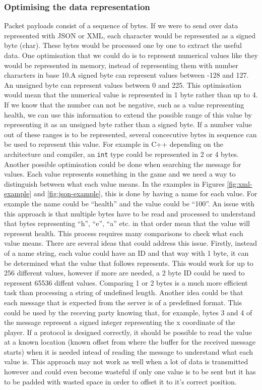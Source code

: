 \subsubsection{Optimising the data representation}
Packet payloads consist of a sequence of bytes. If we were to send over data represented with JSON or XML, each character would be represented as a signed byte (char). These bytes would be processed one by one to extract the useful data. One optimisation that we could do is to represent numerical values like they would be represented in memory, instead of representing them with number characters in base 10.A signed byte can represent values between -128 and 127. An unsigned byte can represent values between 0 and 225. This optimisation would mean that the numerical value is represented in 1 byte rather than up to 4. If we know that the number can not be negative, such as a value representing health, we can use this information to extend the possible range of this value by representing it as an unsigned byte rather than a signed byte. If a number value out of these ranges is to be represented, several concecutive bytes in sequence can be used to represent this value. For example in C++ depending on the architecture and compiler, an \lstinline{int} type could be represented in 2 or 4 bytes.
Another possible optimisation could be done when searching the message for values. Each value represents something in the game and we need a way to distinguish between what each value means. In the examples in Figures \ref{fig:xml-example} and \ref{fig:json-example}, this is done by having a name for each value. For example the name could be ``health'' and the value could be ``100''. An issue with this approach is that multiple bytes have to be read and processed to understand that bytes representing ``h'', ``e'', ``a'' etc. in that order mean that the value will represent health. This process requires many comparisons to check what each value means. There are several ideas that could address this issue. Firstly, instead of a name string, each value could have an ID and that way with 1 byte, it can be determined what the value that follows represents. This would work for up to 256 different values, however if more are needed, a 2 byte ID could be used to represent 65536 diffent values. Comparing 1 or 2 bytes is a much more efficient task than processing a string of undefined length. Another idea could be that each message that is expected from the server is of a predefined format. This could be used by the receving party knowing that, for example, bytes 3 and 4 of the message represent a signed integer representing the x coordinate of the player. If a protocol is designed correctly, it should be possible to read the value at a known location (known offset from where the buffer for the received message starts) when it is needed intead of reading the message to understand what each value is. This approach may not work as well when a lot of data is transmitted however and could even become wasteful if only one value is to be sent but it has to be padded with wasted space in order to offset it to it's correct position.


